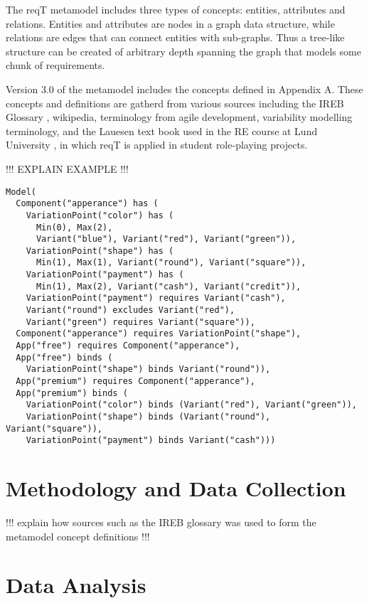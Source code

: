 \documentclass[a4paper]{llncs}
\begin{document}
The reqT metamodel includes three types of concepts: entities, attributes and relations. Entities and attributes are nodes in a graph data structure, while relations are edges that can connect entities with sub-graphs. Thus a tree-like structure can be created of arbitrary depth spanning the graph that models some chunk of requirements. 

Version 3.0 of the metamodel includes the concepts defined in Appendix A. These concepts and definitions are gatherd from various sources including the IREB Glossary \cite{IREB}, wikipedia, terminology from agile development, variability modelling terminology, and the Lauesen text book \cite{Lauesen2002} used in the RE course at Lund University \cite{ets170}, in which reqT is applied in student role-playing projects. 

!!! EXPLAIN EXAMPLE !!!
\begin{spacing}{0.8}
\begingroup
    \fontsize{8pt}{12pt}\selectfont
\begin{lstlisting}
Model(
  Component("apperance") has (
    VariationPoint("color") has (
      Min(0), Max(2),
      Variant("blue"), Variant("red"), Variant("green")),
    VariationPoint("shape") has (
      Min(1), Max(1), Variant("round"), Variant("square")),
    VariationPoint("payment") has (
      Min(1), Max(2), Variant("cash"), Variant("credit")),
    VariationPoint("payment") requires Variant("cash"), 
    Variant("round") excludes Variant("red"),
    Variant("green") requires Variant("square")),
  Component("apperance") requires VariationPoint("shape"), 
  App("free") requires Component("apperance"),  
  App("free") binds (
    VariationPoint("shape") binds Variant("round")),
  App("premium") requires Component("apperance"),  
  App("premium") binds ( 
    VariationPoint("color") binds (Variant("red"), Variant("green")),
    VariationPoint("shape") binds (Variant("round"), Variant("square")),
    VariationPoint("payment") binds Variant("cash")))
\end{lstlisting}
\endgroup
\end{spacing}




\section{Methodology and Data Collection}
!!! explain how sources such as the IREB glossary was used to form the metamodel concept definitions !!!
\section{Data Analysis}
\end{document}
